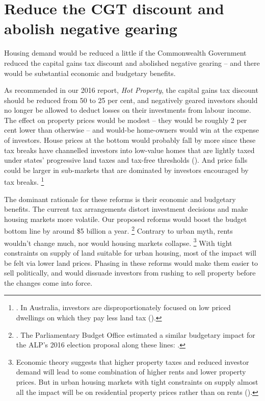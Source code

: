 \section{Reduce the CGT discount and abolish negative gearing}\label{sec:reduce-the-cgt-discount-and-abolish-negative-gearing}

Housing demand would be reduced a little if the Commonwealth Government reduced the capital gains tax discount and abolished negative gearing -- and there would be substantial economic and budgetary benefits.

As recommended in our 2016 report, \emph{Hot Property}, the capital gains tax discount should be reduced from 50 to 25 per cent, and negatively geared investors should no longer be allowed to deduct losses on their investments from labour income.
The effect on property prices would be modest -- they would be roughly 2 per cent lower than otherwise -- and would-be home-owners would win at the expense of investors. House prices at the bottom would probably fall by more since these tax breaks have channelled investors into low-value homes that are lightly taxed under states' progressive land taxes and tax-free thresholds ().
And price falls could be larger in sub-markets that are dominated by investors encouraged by tax breaks.%
    \footnote {\textcites{BIS-2017-interest-rates-house-prices}{Spatial-Herding-Behavior-US-Housing-Market}. In Australia, investors are disproportionately focused on low priced dwellings on which they pay less land tax ().}

The dominant rationale for these reforms is their economic and budgetary benefits.
The current tax arrangements distort investment decisions and make housing markets more volatile.
Our proposed reforms would boost the budget bottom line by around \$5 billion a year.%
	\footnote{\textcite{DaleyWood2016-Negative-Gearing-CGT}. The Parliamentary Budget Office estimated a similar budgetary impact for the ALP's 2016 election proposal along these lines: \textcite[][6]{PBO_2016_postelection_report}.}
Contrary to urban myth, rents wouldn't change much, nor would housing markets collapse.%
    \footnote{Economic theory suggests that higher property taxes and reduced investor demand will lead to some combination of higher rents and lower property prices. But in urban housing markets with tight constraints on supply almost all the impact will be on residential property prices rather than on rents (\textcite[][31]{DaleyWood2016-Negative-Gearing-CGT}).} %
With tight constraints on supply of land suitable for urban housing, most of the impact will be felt via lower land prices.
Phasing in these reforms would make them easier to sell politically, and would dissuade investors from rushing to sell property before the changes come into force.

